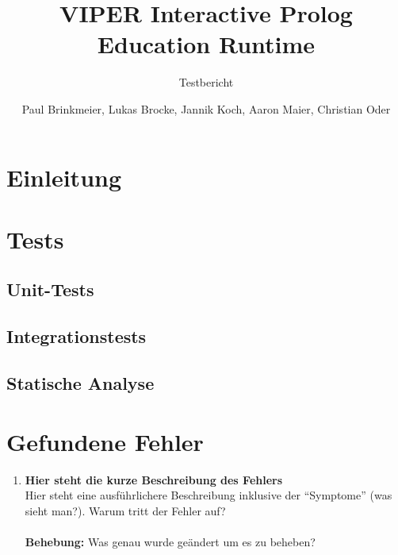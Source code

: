 \documentclass[parskip=full,11pt,twoside]{scrartcl}
\title{VIPER Interactive Prolog Education Runtime}
\subtitle{Testbericht}
\author{Paul Brinkmeier, Lukas Brocke, Jannik Koch, Aaron Maier, Christian Oder}
\begin{document}
\maketitle
\tableofcontents

\section{Einleitung}
\setcounter{page}{1}




\section{Tests}

\subsection{Unit-Tests}



\subsection{Integrationstests}


\subsection{Statische Analyse}


\section{Gefundene Fehler}

\begin{enumerate}[label=\#\arabic*]
  \item \textbf{Hier steht die kurze Beschreibung des Fehlers}\\
        Hier steht eine ausf\"uhrlichere Beschreibung inklusive der \enquote{Symptome} (was sieht man?). Warum tritt der Fehler auf?\\\\
        \textbf{Behebung:} Was genau wurde geändert um es zu beheben?
\end{enumerate}
\end{document}
